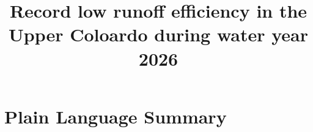 \documentclass[draft]{agujournal2019}
\begin{document}

\title{Record low runoff efficiency in the Upper Coloardo during water year 2026} 






\begin{keypoints}
\item
\end{keypoints}


\begin{abstract}

\end{abstract}

\section*{Plain Language Summary}

%
%
%
\end{document}
